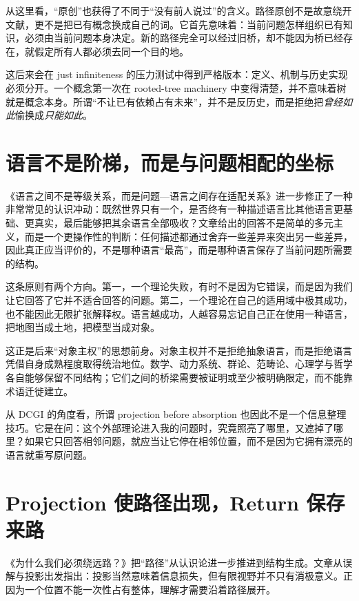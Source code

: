 \documentclass[UTF8,zihao=-4,fontset=none,oneside,openany]{ctexbook}
\begin{document}
从这里看，“原创”也获得了不同于“没有前人说过”的含义。路径原创不是故意绕开文献，更不是把已有概念换成自己的词。它首先意味着：当前问题怎样组织已有知识，必须由当前问题本身决定。新的路径完全可以经过旧桥，却不能因为桥已经存在，就假定所有人都必须去同一个目的地。

这后来会在 just infiniteness 的压力测试中得到严格版本：定义、机制与历史实现必须分开。一个概念第一次在 rooted-tree machinery 中变得清楚，并不意味着树就是概念本身。所谓“不让已有依赖占有未来”，并不是反历史，而是拒绝把\emph{曾经如此}偷换成\emph{只能如此}。

\section{语言不是阶梯，而是与问题相配的坐标}

《语言之间不是等级关系，而是问题—语言之间存在适配关系》进一步修正了一种非常常见的认识冲动：既然世界只有一个，是否终有一种描述语言比其他语言更基础、更真实，最后能够把其余语言全部吸收？文章给出的回答不是简单的多元主义，而是一个更操作性的判断：任何描述都通过舍弃一些差异来突出另一些差异，因此真正应当评价的，不是哪种语言“最高”，而是哪种语言保存了当前问题所需要的结构。\citep{peng-language}

这条原则有两个方向。第一，一个理论失败，有时不是因为它错误，而是因为我们让它回答了它并不适合回答的问题。第二，一个理论在自己的适用域中极其成功，也不能因此无限扩张解释权。语言越成功，人越容易忘记自己正在使用一种语言，把地图当成土地，把模型当成对象。

这正是后来“对象主权”的思想前身。对象主权并不是拒绝抽象语言，而是拒绝语言凭借自身成熟程度取得统治地位。数学、动力系统、群论、范畴论、心理学与哲学各自能够保留不同结构；它们之间的桥梁需要被证明或至少被明确限定，而不能靠术语迁徙建立。

从 DCGI 的角度看，所谓 projection before absorption 也因此不是一个信息整理技巧。它是在问：这个外部理论进入我的问题时，究竟照亮了哪里，又遮掉了哪里？如果它只回答相邻问题，就应当让它停在相邻位置，而不是因为它拥有漂亮的语言就重写原问题。

\section{Projection 使路径出现，Return 保存来路}

《为什么我们必须绕远路？》把“路径”从认识论进一步推进到结构生成。文章从误解与投影出发指出：投影当然意味着信息损失，但有限视野并不只有消极意义。正因为一个位置不能一次性占有整体，理解才需要沿着路径展开。\citep{peng-detour}
\end{document}
